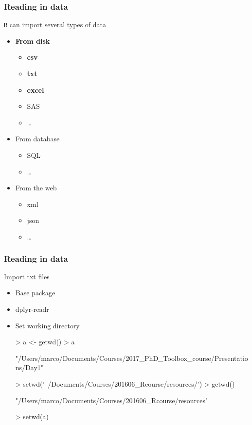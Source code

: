 \documentclass{beamer}
\begin{document}
\begin{frame}[fragile]
	\frametitle{Reading in data}
	\centering \Large \texttt{R} can import several types of data
	\begin{itemize}
		\small
		\item \textbf{From disk}
			\begin{itemize}
				\scriptsize
				\item \textbf{csv}
				\item \textbf{txt}
				\item \textbf{excel}
				\item SAS
				\item \ldots
				\small
			\end{itemize}
		\item From database
			\begin{itemize}
				\scriptsize
				\item SQL
				\item \ldots
				\small
			\end{itemize}
		\item From the web 
			\begin{itemize}
				\scriptsize
				\item xml
				\item json
				\item \ldots
				\small
			\end{itemize}
	\end{itemize}
\end{frame}



\begin{frame}[fragile]
	\frametitle{Reading in data}
	\centering \Large Import txt files
	\begin{itemize}
		\small
		\item Base package
		\item dplyr-readr
	\vspace{20pt}
		\item Set working directory
\vspace{10pt}
\tiny
\setlength{\fancyvrbtopsep}{-1pt}
\setlength{\fancyvrbpartopsep}{-1pt}
\begin{Schunk}
\begin{Sinput}
> a <- getwd()
> a
\end{Sinput}
\begin{Soutput}
[1] "/Users/marco/Documents/Courses/2017_PhD_Toolbox_course/Presentations/Day1"
\end{Soutput}
\begin{Sinput}
> setwd('~/Documents/Courses/201606_Rcourse/resources/')
> getwd()
\end{Sinput}
\begin{Soutput}
[1] "/Users/marco/Documents/Courses/201606_Rcourse/resources"
\end{Soutput}
\begin{Sinput}
> setwd(a)
\end{Sinput}
\end{Schunk}
	\end{itemize}
\end{frame}
\end{document}
